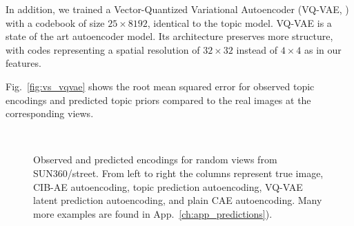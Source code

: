 In addition, we trained a Vector-Quantized Variational Autoencoder (VQ-VAE, \citep{vqvae2017}) with a codebook of size $25 \times 8192$, identical to the topic model. VQ-VAE is a state of the art autoencoder model. Its architecture preserves more structure, with codes representing a spatial resolution of $32 \times 32$ instead of $4 \times 4$ as in our features. 

Fig.~\ref{fig:vs_vqvae} shows the root mean squared error for observed topic encodings and predicted topic priors compared to the real images at the corresponding views.

\begin{figure}
    \begin{center}
    \\
    \end{center}
    \caption{Observed \protect{} and predicted encodings \protect{} for random views from SUN360/street. From left to right the columns represent true image, CIB-AE autoencoding, topic prediction autoencoding, VQ-VAE latent prediction autoencoding, and plain CAE autoencoding. Many more examples are found in App.~\ref{ch:app_predictions}).
    }
    \label{fig:encoding-strip}
\end{figure}


